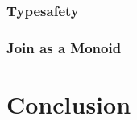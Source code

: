 \documentclass[12pt,a4paper,twoside,openright]{report}
\begin{document}
	\subsection{Typesafety}
	\subsection{Join as a Monoid}

	
\chapter{Conclusion}





\appendix
\end{document}
